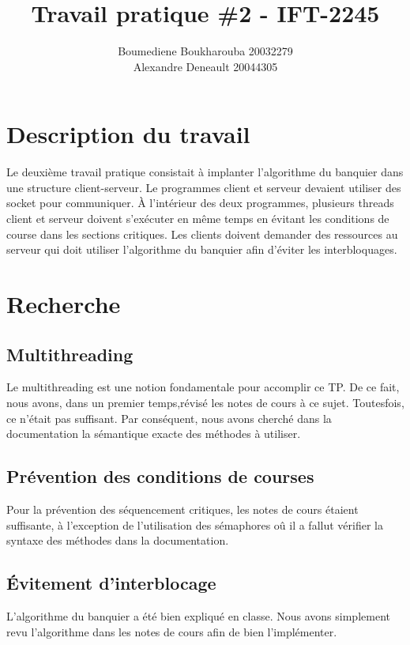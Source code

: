 \documentclass{article}
\title{Travail pratique \#2 - IFT-2245}
\author{Boumediene Boukharouba
20032279\\
Alexandre Deneault
20044305}
\begin{document}
\maketitle

\section{Description du travail}

Le deuxième travail pratique consistait à implanter l'algorithme du banquier 
dans une structure client-serveur. Le programmes client et serveur devaient 
utiliser des socket pour communiquer. À l'intérieur des deux programmes, 
plusieurs threads client et serveur doivent s'exécuter en même temps en 
évitant les conditions de course dans les sections critiques. Les clients 
doivent demander des ressources au serveur qui doit utiliser l'algorithme du banquier 
afin d'éviter les interbloquages.


\section{Recherche}

\subsection{Multithreading}

Le multithreading est une notion fondamentale pour accomplir ce TP. De ce fait, nous
avons, dans un premier temps,révisé les notes de cours à ce sujet. Toutesfois, ce n'était 
pas suffisant. Par conséquent, nous avons cherché dans la documentation la sémantique exacte
des méthodes à utiliser. 


\subsection{Prévention des conditions de courses}

Pour la prévention des séquencement critiques, les notes de cours 
étaient suffisante, à l'exception de l'utilisation des sémaphores oû il a fallut vérifier 
la syntaxe des méthodes dans la documentation.


\subsection{Évitement d'interblocage}

L'algorithme du banquier a été bien expliqué en classe. Nous avons simplement revu 
l'algorithme dans les notes de cours afin de bien l'implémenter.
\end{document}
